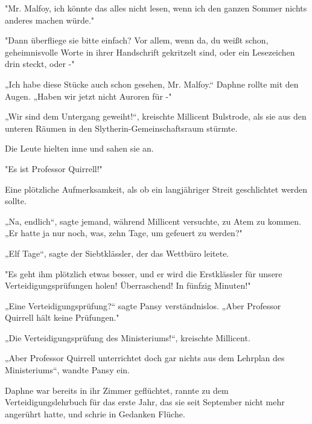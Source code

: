 {"Mr. Malfoy, ich könnte das alles nicht lesen, wenn ich den ganzen Sommer nichts anderes machen würde."

"Dann überfliege sie bitte einfach? Vor allem, wenn da, du weißt schon, geheimnisvolle Worte in ihrer Handschrift gekritzelt sind, oder ein Lesezeichen drin steckt, oder -"

„Ich habe diese Stücke auch schon gesehen, Mr. Malfoy.“ Daphne rollte mit den Augen. „Haben wir jetzt nicht Auroren für -"

„Wir sind dem Untergang geweiht!“, kreischte Millicent Bulstrode, als sie aus den unteren Räumen in den Slytherin-Gemeinschaftsraum stürmte.

Die Leute hielten inne und sahen sie an.

"Es ist Professor Quirrell!"

Eine plötzliche Aufmerksamkeit, als ob ein langjähriger Streit geschlichtet werden sollte.

„Na, endlich“, sagte jemand, während Millicent versuchte, zu Atem zu kommen. „Er hatte ja nur noch, was, zehn Tage, um gefeuert zu werden?"

„Elf Tage“, sagte der Siebtklässler, der das Wettbüro leitete.

"Es geht ihm plötzlich etwas besser, und er wird die Erstklässler für unsere Verteidigungsprüfungen holen! Überraschend! In fünfzig Minuten!"

„Eine Verteidigungsprüfung?“ sagte Pansy verständnislos. „Aber Professor Quirrell hält keine Prüfungen."

„Die Verteidigungsprüfung des Ministeriums!“, kreischte Millicent.

„Aber Professor Quirrell unterrichtet doch gar nichts aus dem Lehrplan des Ministeriums“, wandte Pansy ein.

Daphne war bereits in ihr Zimmer geflüchtet, rannte zu dem Verteidigungslehrbuch für das erste Jahr, das sie seit September nicht mehr angerührt hatte, und schrie in Gedanken Flüche.

}
